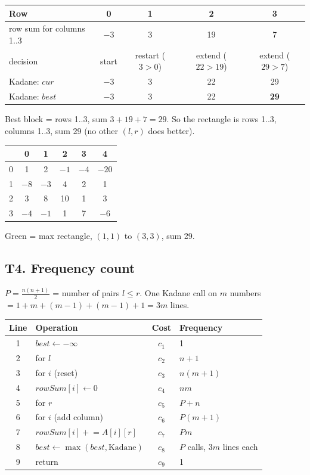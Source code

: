 \documentclass[11pt]{article}
\begin{document}
\begin{center}
\begin{tabular}{lcccc}
\toprule
Row & 0 & 1 & 2 & 3 \\
\midrule
row sum for columns 1..3 & $-3$ & 3 & 19 & 7 \\
decision & start & restart ($3 > 0$) & extend ($22 > 19$) & extend ($29 > 7$) \\
Kadane: $cur$ & $-3$ & 3 & 22 & 29 \\
Kadane: $best$ & $-3$ & 3 & 22 & \textbf{29} \\
\bottomrule
\end{tabular}
\end{center}

Best block = rows 1..3, sum $3 + 19 + 7 = 29$. So the rectangle is rows 1..3, columns 1..3, sum 29 (no other $(l, r)$ does better).

\begin{center}
\renewcommand{\arraystretch}{1.25}
\begin{tabular}{c|ccccc}
 & 0 & 1 & 2 & 3 & 4 \\ \hline
0 & 1 & 2 & $-1$ & $-4$ & $-20$ \\
1 & $-8$ & \cellcolor{path}$-3$ & \cellcolor{path}4 & \cellcolor{path}2 & 1 \\
2 & 3 & \cellcolor{path}8 & \cellcolor{path}10 & \cellcolor{path}1 & 3 \\
3 & $-4$ & \cellcolor{path}$-1$ & \cellcolor{path}1 & \cellcolor{path}7 & $-6$ \\
\end{tabular}
\end{center}

Green = max rectangle, $(1,1)$ to $(3,3)$, sum 29.

\subsection*{T4. Frequency count}

$P = \frac{n(n+1)}{2}$ = number of pairs $l \le r$. One Kadane call on $m$ numbers $= 1 + m + (m-1) + (m-1) + 1 = 3m$ lines.

\begin{center}
\begin{tabular}{clcl}
\toprule
Line & Operation & Cost & Frequency \\
\midrule
1 & $best \gets -\infty$ & $c_1$ & 1 \\
2 & for $l$ & $c_2$ & $n+1$ \\
3 & for $i$ (reset) & $c_3$ & $n(m+1)$ \\
4 & $rowSum[i] \gets 0$ & $c_4$ & $nm$ \\
5 & for $r$ & $c_5$ & $P + n$ \\
6 & for $i$ (add column) & $c_6$ & $P(m+1)$ \\
7 & $rowSum[i] \mathrel{+}= A[i][r]$ & $c_7$ & $Pm$ \\
8 & $best \gets \max(best, \text{Kadane})$ & $c_8$ & $P$ calls, $3m$ lines each \\
9 & return & $c_9$ & 1 \\
\bottomrule
\end{tabular}
\end{center}
\end{document}
